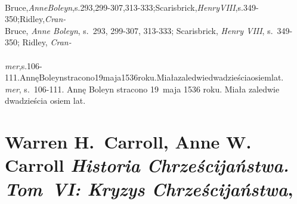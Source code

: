 \documentclass[a4paper,11pt]{article}
\begin{document}
\begin{center}
\begin{tabular}{|c|c|c|c|c|}
    \hline
  \end{tabular}

\end{center}

\VerSpaceSix


\noindent
{} \\
\Jest Bruce,\textit{AnneBoleyn},s.293,299-307,313-333;Scarisbrick,\textit{HenryVIII},s.349-350;Ridley,\textit{Cran-} \\
\Powin Bruce, \textit{Anne Boleyn}, s.~293, 299-307, 313-333; Scarisbrick,
\textit{Henry VIII}, s.~349-350; Ridley, \textit{Cran-} \\
 \\
\Jest
\textit{mer},s.106-111.AnnęBoleynstracono19maja1536roku.Miałazaledwiedwadzieściaosiemlat. \\
\Powin \textit{mer}, s.~106-111. Annę Boleyn stracono 19~maja 1536 roku.
Miała zaledwie dwadzieścia osiem lat. \\












\section{ %
  Warren H.~Carroll, Anne W. Carroll
  \textit{Historia Chrześcijaństwa. Tom~VI: Kryzys Chrześcijaństwa},
  \cite{CarrollCarrollHistoriaChrzecijanstwaVolVI2014}}
\end{document}
